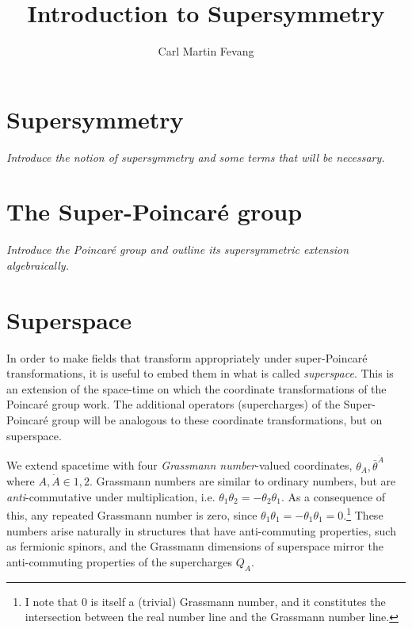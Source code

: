 \documentclass[english,notitlepage]{article}
\title{Introduction to Supersymmetry}
\author{Carl Martin Fevang}
\begin{document}
\maketitle

\section{Supersymmetry}
\textit{Introduce the notion of supersymmetry and some terms that will be necessary.}

\section{The Super-Poincaré group}
\textit{Introduce the Poincaré group and outline its supersymmetric extension algebraically.}

\section{Superspace}
In order to make fields that transform appropriately under super-Poincaré transformations, it is useful to embed them in what is called \emph{superspace}.
This is an extension of the space-time on which the coordinate transformations of the Poincaré group work.
The additional operators (supercharges) of the Super-Poincaré group will be analogous to these coordinate transformations, but on superspace.

We extend spacetime with four \emph{Grassmann number}-valued coordinates, \(\theta_A, \bar{\theta}^{\dot{A}}\) where \(A, \dot{A} \in 1, 2\).
Grassmann numbers are similar to ordinary numbers, but are \emph{anti}-commutative under multiplication, i.e. \(\theta_1 \theta_2 = -\theta_2 \theta_1\).
As a consequence of this, any repeated Grassmann number is zero, since \(\theta_1\theta_1 = -\theta_1\theta_1 = 0\).\footnote{I note that 0 is itself a (trivial) Grassmann number, and it constitutes the intersection between the real number line and the Grassmann number line.}
These numbers arise naturally in structures that have anti-commuting properties, such as fermionic spinors, and the Grassmann dimensions of superspace mirror the anti-commuting properties of the supercharges \(Q_A\).
\end{document}
